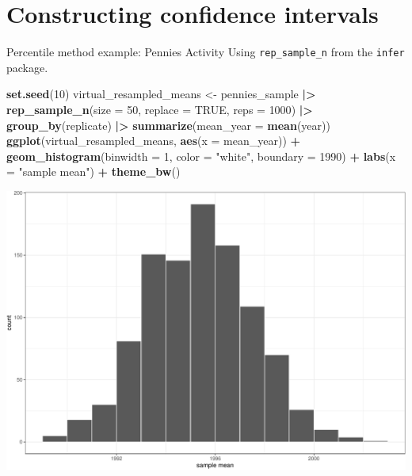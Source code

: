\documentclass[
  ignorenonframetext,
]{beamer}
\newenvironment{Shaded}{\begin{snugshade}}{\end{snugshade}}
\newcommand{\AttributeTok}[1]{\textcolor[rgb]{0.13,0.29,0.53}{#1}}
\newcommand{\ConstantTok}[1]{\textcolor[rgb]{0.56,0.35,0.01}{#1}}
\newcommand{\DecValTok}[1]{\textcolor[rgb]{0.00,0.00,0.81}{#1}}
\newcommand{\FunctionTok}[1]{\textcolor[rgb]{0.13,0.29,0.53}{\textbf{#1}}}
\newcommand{\NormalTok}[1]{#1}
\newcommand{\OtherTok}[1]{\textcolor[rgb]{0.56,0.35,0.01}{#1}}
\newcommand{\SpecialCharTok}[1]{\textcolor[rgb]{0.81,0.36,0.00}{\textbf{#1}}}
\newcommand{\StringTok}[1]{\textcolor[rgb]{0.31,0.60,0.02}{#1}}
\begin{document}
\hypertarget{constructing-confidence-intervals}{%
\section{Constructing confidence
intervals}\label{constructing-confidence-intervals}}

\begin{frame}[fragile]{Percentile method example: Pennies Activity}
\protect\hypertarget{percentile-method-example-pennies-activity}{}
Using \texttt{rep\_sample\_n} from the \texttt{infer} package.

\tiny

\begin{Shaded}
\begin{Highlighting}[]
\FunctionTok{set.seed}\NormalTok{(}\DecValTok{10}\NormalTok{)}
\NormalTok{virtual\_resampled\_means }\OtherTok{\textless{}{-}}\NormalTok{ pennies\_sample }\SpecialCharTok{|\textgreater{}} 
  \FunctionTok{rep\_sample\_n}\NormalTok{(}\AttributeTok{size =} \DecValTok{50}\NormalTok{, }\AttributeTok{replace =} \ConstantTok{TRUE}\NormalTok{, }\AttributeTok{reps =} \DecValTok{1000}\NormalTok{) }\SpecialCharTok{|\textgreater{}} 
  \FunctionTok{group\_by}\NormalTok{(replicate) }\SpecialCharTok{|\textgreater{}} 
  \FunctionTok{summarize}\NormalTok{(}\AttributeTok{mean\_year =} \FunctionTok{mean}\NormalTok{(year))}
\FunctionTok{ggplot}\NormalTok{(virtual\_resampled\_means, }\FunctionTok{aes}\NormalTok{(}\AttributeTok{x =}\NormalTok{ mean\_year)) }\SpecialCharTok{+}
  \FunctionTok{geom\_histogram}\NormalTok{(}\AttributeTok{binwidth =} \DecValTok{1}\NormalTok{, }\AttributeTok{color =} \StringTok{"white"}\NormalTok{, }\AttributeTok{boundary =} \DecValTok{1990}\NormalTok{) }\SpecialCharTok{+}
  \FunctionTok{labs}\NormalTok{(}\AttributeTok{x =} \StringTok{"sample mean"}\NormalTok{) }\SpecialCharTok{+}
  \FunctionTok{theme\_bw}\NormalTok{()}
\end{Highlighting}
\end{Shaded}

\begin{center}\includegraphics[width=0.6\linewidth,height=0.4\textheight]{Week10_Lect_files/figure-beamer/unnamed-chunk-14-1} \end{center}
\normalsize
\end{frame}
\end{document}
